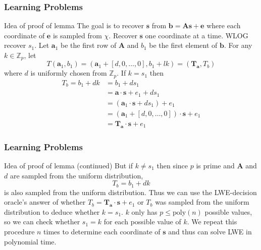 \documentclass{beamer}
\renewcommand{\v}{\mathbf}
\begin{document}
\begin{frame}
\frametitle{Learning Problems}
\begin{block}{Idea of proof of lemma}
    The goal is to recover $\v{s}$ from
    $\v{b} = \v{As+e}$
    where each coordinate of $\v{e}$ is sampled from $\chi$.
Recover $\v{s}$ one coordinate at a time. WLOG recover $s_1$.
Let $\v{a}_1$ be the first row of $\v{A}$ and $b_1$ be the first element of $\v{b}$.
For any $k \in \mathbb{Z}_p$, let 
\[
    T(\v{a}_1, b_1) = 
    (\v{a}_1 + [d,0,\ldots,0], b_1+lk)
    = (\v{T_a},T_b)
\]
where $d$ is uniformly chosen from
$\mathbb{Z}_p$. If $k=s_1$ then 
\begin{align*}
    T_b = b_1+dk &= b_1 + ds_1 \\
           &= \v{a\cdot s} + e_1 + ds_1  \\
    &= (\v{a}_1\cdot \v{s} + ds_1) + e_1 \\
    &= (\v{a}_1 + [d,0,\ldots,0]) \cdot \v{s} + e_1 \\
    &= \v{T_a} \cdot \v{s} + e_1
\end{align*}
\end{block}
\end{frame}

\begin{frame}
\frametitle{Learning Problems}
\begin{block}{Idea of proof of lemma (continued)}
    But if $k \neq s_1$ then since $p$ is prime and $\v{A}$
    and $d$ are sampled from the uniform distribution,
    \[
        T_b = b_1 + dk
    \]
    is also sampled from the uniform distribution.
    Thus we can use the LWE-decision oracle's answer of whether 
    $T_b = \v{T_a} \cdot \v{s} + e_1$ or $T_b$ was sampled from the 
    uniform distribution to deduce whether $k = s_1$.
    $k$ only has $p \leq \text{poly}(n)$ possible values, so we can
    check whether $s_1 = k$ for each possible value of $k$.
    We repeat this procedure $n$ times to determine each coordinate of $\v{s}$
    and thus can solve LWE in polynomial time.
\end{block}
\end{frame}
\end{document}
